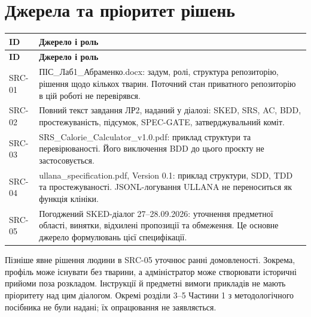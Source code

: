 \documentclass[11pt,a4paper]{article}
\begin{document}
\section{Джерела та пріоритет рішень}
\begin{longtable}{>{\raggedright\arraybackslash}p{2cm} >{\raggedright\arraybackslash}p{13.6cm}}
\toprule
\textbf{ID} & \textbf{Джерело і роль} \\ \midrule
\endfirsthead
\toprule
\textbf{ID} & \textbf{Джерело і роль} \\ \midrule
\endhead
\bottomrule
\endfoot
SRC-01 & ПІС\_Лаб1\_Абраменко.docx: задум, ролі, структура репозиторію, рішення щодо кількох тварин. Поточний стан приватного репозиторію в цій роботі не перевірявся. \\
SRC-02 & Повний текст завдання ЛР2, наданий у діалозі: SKED, SRS, AC, BDD, простежуваність, підсумок, SPEC-GATE, затверджувальний коміт. \\
SRC-03 & SRS\_Calorie\_Calculator\_v1.0.pdf: приклад структури та перевірюваності. Його виключення BDD до цього проєкту не застосовується. \\
SRC-04 & ullana\_specification.pdf, Version 0.1: приклад структури, SDD, TDD та простежуваності. JSONL-логування ULLANA не переноситься як функція клініки. \\
SRC-05 & Погоджений SKED-діалог 27–28.09.2026: уточнення предметної області, винятки, відхилені пропозиції та обмеження. Це основне джерело формулювань цієї специфікації. \\
\end{longtable}

Пізніше явне рішення людини в SRC-05 уточнює ранні домовленості. Зокрема, профіль може існувати без тварини, а адміністратор може створювати історичні прийоми поза розкладом. Інструкції й предметні вимоги прикладів не мають пріоритету над цим діалогом. Окремі розділи 3–5 Частини 1 з методологічного посібника не були надані; їх опрацювання не заявляється.
\end{document}
